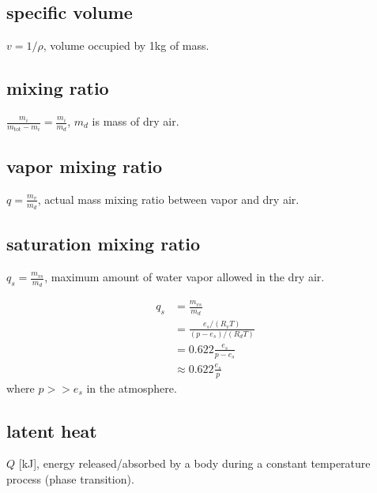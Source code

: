 \subsection{specific volume}
\begin{defn*} $v = 1/\rho$, volume occupied by 1kg of mass.
\end{defn*}

\subsection{mixing ratio}
\begin{defn*} $ \frac{m_i}{m_{\text{tot}}-m_i} = \frac{m_i}{m_d} $, $m_d$ is mass of dry air.
\end{defn*}

\subsection{vapor mixing ratio}
\begin{defn*} $ q = \frac{m_v}{m_d}$, actual mass mixing ratio between vapor and dry air.
\end{defn*}

\subsection{saturation mixing ratio}
\begin{defn*} $ q_s = \frac{m_{vs}}{m_d}$, maximum amount of water vapor allowed in the dry air.
\end{defn*}
\begin{derv*} 
\begin{equation}
\begin{aligned}
   q_s & = \frac{m_{vs}}{m_d} \\
       & = \frac{e_s/(R_v T)}{(p-e_s)/(R_dT)} \\
       & = 0.622\frac{e_s}{p-e_s} \\
       & \approx 0.622\frac{e_s}{p}
\end{aligned}
\end{equation}
where $p >> e_s$ in the atmosphere.
\end{derv*} 

\subsection{latent heat}
\begin{defn*} $Q$ [kJ], energy released/absorbed by a body during a constant temperature process
(phase transition).
\end{defn*}

